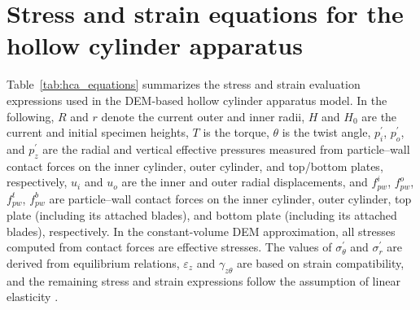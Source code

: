 \section{Stress and strain equations for the hollow cylinder apparatus}
\label{sec:appendix_hca}

Table~\ref{tab:hca_equations} summarizes the stress and strain evaluation expressions used in the DEM-based hollow cylinder apparatus model. In the following, $R$ and $r$ denote the current outer and inner radii, $H$ and $H_0$ are the current and initial specimen heights, $T$ is the torque, $\theta$ is the twist angle, $p_i^{\prime}$, $p_o^{\prime}$, and $p_z^{\prime}$ are the radial and vertical effective pressures measured from particle--wall contact forces on the inner cylinder, outer cylinder, and top/bottom plates, respectively, $u_i$ and $u_o$ are the inner and outer radial displacements, and $f_{pw}^{i}$, $f_{pw}^{o}$, $f_{pw}^{t}$, $f_{pw}^{b}$ are particle--wall contact forces on the inner cylinder, outer cylinder, top plate (including its attached blades), and bottom plate (including its attached blades), respectively. In the constant-volume DEM approximation, all stresses computed from contact forces are effective stresses. The values of $\sigma_\theta^{\prime}$ and $\sigma_r^{\prime}$ are derived from equilibrium relations, $\varepsilon_z$ and $\gamma_{z\theta}$ are based on strain compatibility, and the remaining stress and strain expressions follow the assumption of linear elasticity \citep{Hight1983}.

